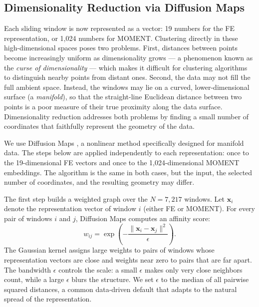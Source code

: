 \documentclass[12pt]{article}
\begin{document}
\subsection{Dimensionality Reduction via Diffusion Maps}
\label{sec:diffmaps}

Each sliding window is now represented as a vector: 19 numbers for the FE representation, or 1,024 numbers for MOMENT.
Clustering directly in these high-dimensional spaces poses two problems.
First, distances between points become increasingly uniform as dimensionality grows --- a phenomenon known as the \emph{curse of dimensionality} \citep{beyer1999} --- which makes it difficult for clustering algorithms to distinguish nearby points from distant ones.
Second, the data may not fill the full ambient space.
Instead, the windows may lie on a curved, lower-dimensional surface (a \emph{manifold}), so that the straight-line Euclidean distance between two points is a poor measure of their true proximity along the data surface.
Dimensionality reduction addresses both problems by finding a small number of coordinates that faithfully represent the geometry of the data.

We use Diffusion Maps \citep{coifman2006}, a nonlinear method specifically designed for manifold data.
The steps below are applied independently to each representation: once to the 19-dimensional FE vectors and once to the 1,024-dimensional MOMENT embeddings.
The algorithm is the same in both cases, but the input, the selected number of coordinates, and the resulting geometry may differ.

The first step builds a weighted graph over the $N = 7{,}217$ windows.
Let $\mathbf{x}_i$ denote the representation vector of window $i$ (either FE or MOMENT).
For every pair of windows $i$ and $j$, Diffusion Maps computes an affinity score:
\begin{equation}
w_{ij}
=
\exp\!\left(
-\frac{\|\mathbf{x}_i-\mathbf{x}_j\|^2}{\epsilon}
\right).
\label{eq:diffusion_kernel}
\end{equation}
The Gaussian kernel assigns large weights to pairs of windows whose representation vectors are close and weights near zero to pairs that are far apart.
The bandwidth $\epsilon$ controls the scale: a small $\epsilon$ makes only very close neighbors count, while a large $\epsilon$ blurs the structure.
We set $\epsilon$ to the median of all pairwise squared distances, a common data-driven default that adapts to the natural spread of the representation.
\end{document}
